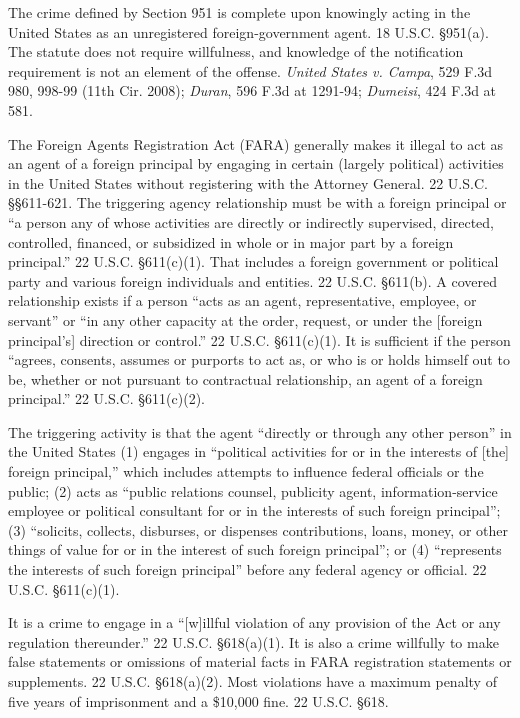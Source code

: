 The crime defined by Section 951 is complete upon knowingly acting in the United States as an unregistered foreign-government agent.
18 U.S.C. \S 951(a).
The statute does not require willfulness, and knowledge of the notification requirement is not an element of the offense.
\textit{United States v. Campa}, 529 F.3d 980, 998-99 (11th Cir. 2008); \textit{Duran}, 596 F.3d at 1291-94; \textit{Dumeisi}, 424 F.3d at 581.

The Foreign Agents Registration Act (FARA) generally makes it illegal to act as an agent of a foreign principal by engaging in certain (largely political) activities in the United States without registering with the Attorney General. 22 U.S.C. \S\S 611-621. The triggering agency relationship must be with a foreign principal or ``a person any of whose activities are directly or indirectly supervised, directed, controlled, financed, or subsidized in whole or in major part by a foreign principal.'' 22 U.S.C. \S 611(c)(1).
That includes a foreign government or political party and various foreign individuals and entities.
22 U.S.C. \S 611(b).
A covered relationship exists if a person ``acts as an agent, representative, employee, or servant'' or ``in any other capacity at the order, request, or under the [foreign principal's] direction or control.''
22 U.S.C. \S 611(c)(1).
It is sufficient if the person ``agrees, consents, assumes or purports to act as, or who is or holds himself out to be, whether or not pursuant to contractual relationship, an agent of a foreign principal.''
22 U.S.C. \S 611(c)(2).

The triggering activity is that the agent ``directly or through any other person'' in the United States (1) engages in ``political activities for or in the interests of [the] foreign principal,'' which includes attempts to influence federal officials or the public; (2) acts as ``public relations counsel, publicity agent, information-service employee or political consultant for or in the interests of such foreign principal''; (3) ``solicits, collects, disburses, or dispenses contributions, loans, money, or other things of value for or in the interest of such foreign principal''; or (4) ``represents the interests of such foreign principal'' before any federal agency or official.
22 U.S.C. \S 611(c)(1).

It is a crime to engage in a ``[w]illful violation of any provision of the Act or any regulation thereunder.''
22 U.S.C. \S 618(a)(1).
It is also a crime willfully to make false statements or omissions of material facts in FARA registration statements or supplements.
22 U.S.C. \S 618(a)(2).
Most violations have a maximum penalty of five years of imprisonment and a \$10,000 fine.
22 U.S.C. \S 618.


